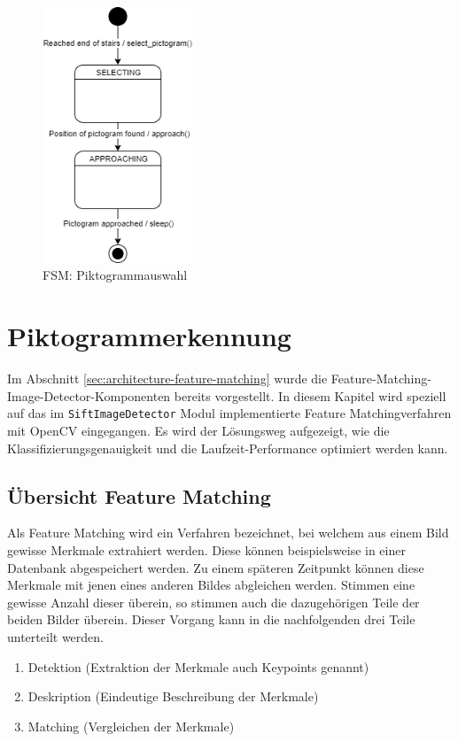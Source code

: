 \begin{figure}[H]
  \includegraphics[width=0.40\textwidth]{img/softwarearchitektur/FSM-PICTOGRAM_SELECTION.png}
  \centering
  \caption{FSM: Piktogrammauswahl}
  \label{fig:fsm-pictogram-selection}
\end{figure}



\section{Piktogrammerkennung}
Im Abschnitt \ref{sec:architecture-feature-matching} wurde die Feature-Matching-Image-Detector-Komponenten bereits vorgestellt. In diesem Kapitel wird speziell auf das im \texttt{SiftImageDetector} Modul implementierte Feature Matchingverfahren mit OpenCV eingegangen. Es wird der Lösungsweg aufgezeigt, wie die Klassifizierungsgenauigkeit und die Laufzeit-Performance optimiert werden kann.

\subsection{Übersicht Feature Matching}
Als Feature Matching wird ein Verfahren bezeichnet, bei welchem aus einem Bild gewisse Merkmale extrahiert werden. Diese können beispielsweise in einer Datenbank abgespeichert werden. Zu einem späteren Zeitpunkt können diese Merkmale mit jenen eines anderen Bildes abgleichen werden. Stimmen eine gewisse Anzahl dieser überein, so stimmen auch die dazugehörigen Teile der beiden Bilder überein. Dieser Vorgang kann in die nachfolgenden drei Teile unterteilt werden.

\begin{enumerate}
    \item Detektion (Extraktion der Merkmale auch Keypoints genannt)
    \item Deskription (Eindeutige Beschreibung der Merkmale)
    \item Matching (Vergleichen der Merkmale)
\end{enumerate}

